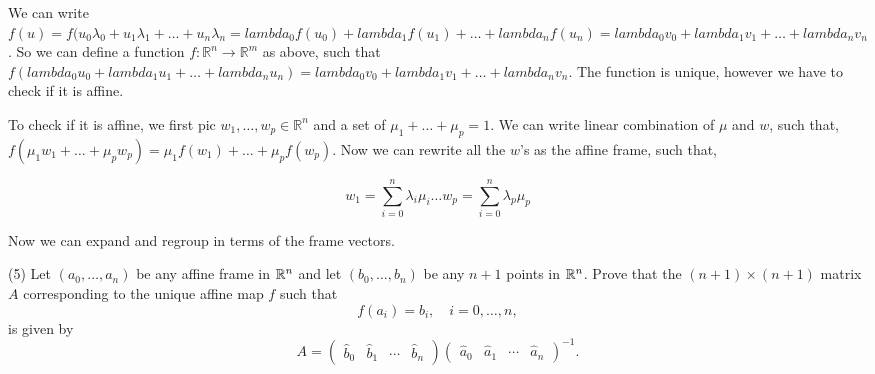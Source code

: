 \documentclass[12pt]{article}
\begin{document}
We can write $f(u) = f(u_0\lambda_0 + u_1\lambda_1 + \ldots + u_n\lambda_n = lambda_0f(u_0) + lambda_1f(u_1) + \ldots + lambda_nf(u_n) = lambda_0v_0 + lambda_1v_1 + \ldots + lambda_nv_n$. So we can define a function $f: \mathbb{R} ^n \rightarrow \mathbb{R} ^m$ as above, such that $f(lambda_0u_0 + lambda_1u_1 + \ldots + lambda_nu_n) = lambda_0v_0 + lambda_1v_1 + \ldots + lambda_nv_n$. The function is unique, however we have to check if it is affine. 

To check if it is affine, we first pic $w_1, \ldots, w_p \in \mathbb{R}^n$ and a set of $\mu_1 + \ldots + \mu_p = 1$. We can write linear combination of $\mu$ and $w$, such that, 
$f(\mu_1 w_1 + \ldots + \mu_p w_p) = \mu_1 f(w_1) + \ldots + \mu_p f(w_p)$. Now we can rewrite all the $w$'s as the affine frame, such that, 

$$w_1 = \sum_{i=0}^{n} \lambda_i \mu_i \ldots w_p = \sum_{i=0}^{n} \lambda_p \mu_p$$

Now we can expand and regroup in terms of the frame vectors. 



\medskip
(5)
Let $(a_0, \ldots, a_n)$ be any affine frame in $\mathbb{R}^n$ and
let $(b_0, \ldots, b_n)$ be any $n + 1$ points in $\mathbb{R}^n$. Prove that
the $(n + 1)\times (n + 1)$ matrix $A$ corresponding to
the unique affine map $f$
such that 
\[
f(a_i) = b_i, \quad i = 0, \ldots, n, 
\]
is given by
\[
A = 
\begin{pmatrix}
\widehat{b}_0 & \widehat{b}_1 & \cdots & \widehat{b}_n   
\end{pmatrix}
\begin{pmatrix}
\widehat{a}_0 & \widehat{a}_1 & \cdots & \widehat{a}_n   
\end{pmatrix}^{-1}.
\]
\end{document}
